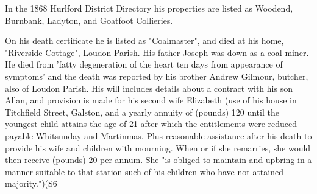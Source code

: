 In the 1868 Hurlford District Directory his properties are listed as Woodend, Burnbank, Ladyton, and Goatfoot Collieries.

On his death certificate he is listed as "Coalmaster", and died at his home, "Riverside Cottage", Loudon Parish. His father Joseph was down as a coal miner. He died from 'fatty degeneration of the heart ten days from appearance of symptoms' and the death was reported by his brother Andrew Gilmour, butcher, also of Loudon Parish. His will includes details about a contract with his son Allan, and provision is made for his second wife Elizabeth (use of his house in Titchfield Street, Galston, and a yearly annuity of (pounds) 120 until the youngest child attains the age of 21 after which the entitlements were reduced - payable Whitsunday and Martinmas. Plus reasonable assistance after his death to provide his wife and children with mourning. When or if she remarries, she would then receive (pounds) 20 per annum. She "is obliged to maintain and upbring in a manner suitable to that station such of his children who have not attained majority.")(S6 
